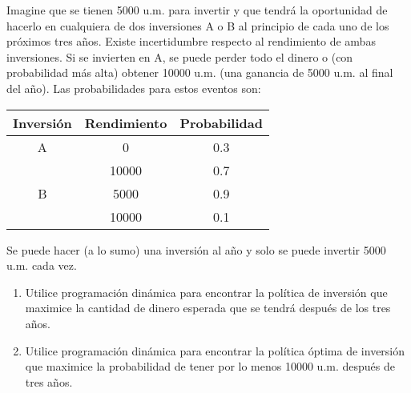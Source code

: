 \documentclass[twoside]{article}
\begin{document}
\newpage 
\begin{ejercicio}{7}
Imagine que se tienen 5000 u.m. para invertir y que tendrá la oportunidad de hacerlo en cualquiera de dos inversiones A o B al principio de cada uno de los próximos tres años. Existe incertidumbre respecto al rendimiento de ambas inversiones. Si se invierten en A, se puede perder todo el dinero o (con probabilidad más alta) obtener 10000 u.m. (una ganancia de 5000 u.m. al final del año). Las probabilidades para estos eventos son:
\begin{center}
\begin{tabular}{c| c c}
\hline
Inversión & Rendimiento & Probabilidad\\
\hline
A & 0 & 0.3\\
  & 10000 &  0.7\\
 \hline
 B & 5000 & 0.9\\
   & 10000 & 0.1\\
   \hline
\end{tabular}
\end{center}
Se puede hacer (a lo sumo) una inversión al año y solo se puede invertir 5000 u.m. cada vez.
\begin{enumerate}
\item Utilice programación dinámica para encontrar la política de inversión que maximice la cantidad de dinero esperada que se tendrá después de los tres años.
\item Utilice programación dinámica para encontrar la política óptima de inversión que maximice la probabilidad de tener por lo menos 10000 u.m. después de tres años.
\end{enumerate}
\end{ejercicio}
\end{document}
